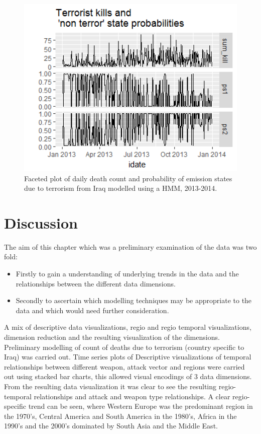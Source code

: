 \begin{figure}[t]
\includegraphics[width=15cm]{Peters_experiment_markdown_files/figure-latex/Rplot02_2013_2014.png}
\caption{Faceted plot of daily death count and probability of emission states due to terrorism from Iraq modelled using a HMM, 2013-2014.}
\label{fig:Rplot02_2013_2014_HMM}
\centering
\end{figure}

\section{Discussion}

The aim of this chapter which was a preliminary examination of the data was two fold:
\begin{itemize}
\item Firstly to gain a understanding of underlying trends in the data and the relationships between the different data dimensions.
\item Secondly to ascertain which modelling techniques may be appropriate to the data and which would need further consideration.
\end{itemize}
A mix of descriptive data visualizations, regio and regio temporal visualizations, dimension reduction and the resulting visualization of the dimensions. Preliminary modelling of count of deaths due to terrorism (country specific to Iraq) was carried out.
Time series plots of Descriptive visualizations of temporal relationships between different weapon, attack vector and regions were carried out using stacked bar charts, this allowed visual encodings  of 3 data dimensions. From the resulting data visualization it was clear to see the resulting regio-temporal relationships and  attack and weapon type relationships. A clear regio-specific trend can be seen, where Western Europe was the predominant region in the 1970's, Central America and South America in the 1980's, Africa in the 1990's and the 2000's dominated by South Asia and the Middle East. 

